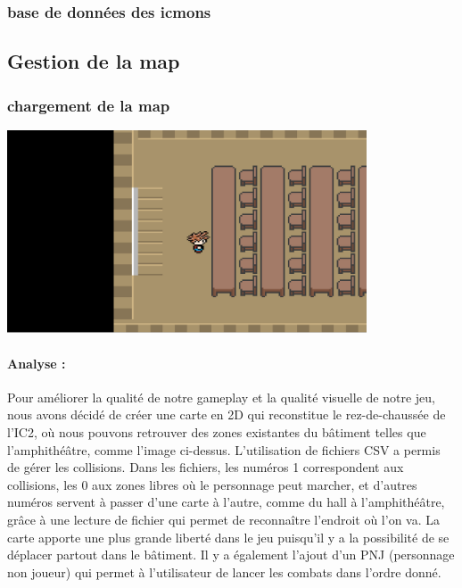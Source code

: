 \documentclass[12pt,a4paper, twoside]{article}
\begin{document}
    \subsubsection{base de données des icmons}
\newpage
\subsection{Gestion de la map}
    \subsubsection{chargement de la map}
    \includegraphics[width=0.8\textwidth]{../docs/img/screenshots/screen2.png}
    \newline
    \paragraph{Analyse : }
   
    Pour améliorer la qualité de notre gameplay et la qualité visuelle de notre jeu, nous avons décidé de créer une carte en 2D qui reconstitue le rez-de-chaussée de l'IC2, où nous pouvons retrouver des
    zones existantes du bâtiment telles que l'amphithéâtre, comme l'image ci-dessus. L'utilisation de fichiers CSV a permis de gérer les collisions. Dans les fichiers, les numéros 1 correspondent 
    aux collisions, les 0 aux zones libres où le personnage peut marcher, et d'autres numéros servent à passer d'une carte à l'autre, comme du hall à l'amphithéâtre, grâce à une lecture de fichier qui permet
    de reconnaître l'endroit où l'on va. La carte apporte une plus grande liberté dans le jeu puisqu'il y a la possibilité de se déplacer partout dans le bâtiment. Il y a également l'ajout d'un PNJ
    (personnage non joueur) qui permet à l'utilisateur de lancer les combats dans l'ordre donné. 
    \newline
\end{document}

